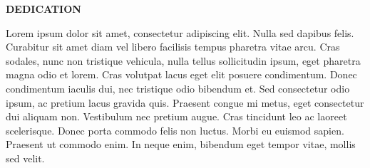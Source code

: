 \thispagestyle{empty}

\begin{center}
\textbf{DEDICATION}
\end{center}

\smallskip

Lorem ipsum dolor sit amet, consectetur adipiscing elit. Nulla sed dapibus felis. Curabitur sit amet diam vel libero facilisis tempus pharetra vitae arcu. Cras sodales, nunc non tristique vehicula, nulla tellus sollicitudin ipsum, eget pharetra magna odio et lorem. Cras volutpat lacus eget elit posuere condimentum. Donec condimentum iaculis dui, nec tristique odio bibendum et. Sed consectetur odio ipsum, ac pretium lacus gravida quis. Praesent congue mi metus, eget consectetur dui aliquam non. Vestibulum nec pretium augue. Cras tincidunt leo ac laoreet scelerisque. Donec porta commodo felis non luctus. Morbi eu euismod sapien. Praesent ut commodo enim. In neque enim, bibendum eget tempor vitae, mollis sed velit.



